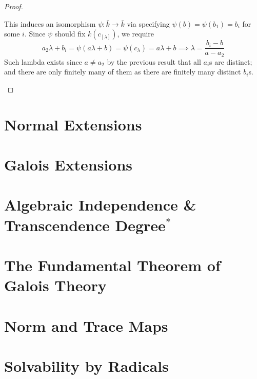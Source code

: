 \documentclass{article}
\begin{document}
\begin{proof}
\begin{itemize}
        \begin{minipage}{\linewidth}
            \centering
        \end{minipage}
        This induces an isomorphism $\psi: \bar{k} \to \bar{k}$ via specifying $\psi(b) = \psi(b_1) = b_i$ for some $i$. Since $\psi$ should fix $k(c_[\lambda])$, we require
        \[
            a_2 \lambda + b_i = \psi(a \lambda + b) = \psi(c_{\lambda}) = a \lambda + b \implies \lambda = \frac{b_i - b}{a - a_2}
        \]
        Such lambda exists since $a \neq a_2$ by the previous result that all $a_i$s are distinct; and there are only finitely many of them as there are finitely many distinct $b_i$s.
    \end{itemize}
\end{proof}

\section{Normal Extensions}

\section{Galois Extensions}

\section{Algebraic Independence \& Transcendence Degree$^{\ast}$}

\section{The Fundamental Theorem of Galois Theory}

\section{Norm and Trace Maps}

\section{Solvability by Radicals}
\end{document}
